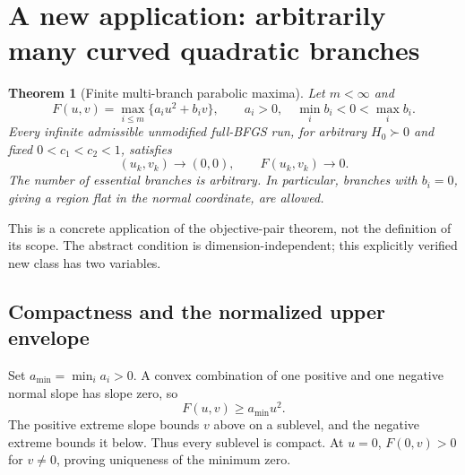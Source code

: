 \documentclass[10pt,oneside,openany]{book}
\newtheorem{theorem}{Theorem}[chapter]
\theoremstyle{remark}\newtheorem{remark}{Remark}[chapter]
\begin{document}
\begingroup
\providecommand{\R}{}
\renewcommand{\R}{\mathbb R}
\providecommand{\tr}{}
\renewcommand{\tr}{\operatorname{tr}}
\providecommand{\diag}{}
\renewcommand{\diag}{\operatorname{diag}}
\providecommand{\Span}{}
\renewcommand{\Span}{\operatorname{span}}
\providecommand{\ip}{}
\renewcommand{\ip}[2]{\langle #1,#2\rangle}
\providecommand{\norm}{}
\renewcommand{\norm}[1]{\lVert #1\rVert}
\providecommand{\T}{}
\renewcommand{\T}{^{\mathsf T}}
\providecommand{\D}{}
\renewcommand{\D}{\mathcal D}
\setcounter{section}{4}
\setcounter{theorem}{1}
\setcounter{lemma}{0}
\setcounter{corollary}{0}
\setcounter{proposition}{0}
\setcounter{remark}{0}
\setcounter{equation}{6}
\section{A new application: arbitrarily many curved quadratic branches}
\begin{theorem}[Finite multi-branch parabolic maxima]
Let $m<\infty$ and
\[
 F(u,v)=\max_{i\le m}\{a_i u^2+b_i v\},\qquad
 a_i>0,\quad\min_i b_i<0<\max_i b_i.
\]
Every infinite admissible unmodified full-BFGS run, for arbitrary $H_0\succ0$ and fixed $0<c_1<c_2<1$, satisfies
\[
 (u_k,v_k)\to(0,0),\qquad F(u_k,v_k)\to0.
\]
The number of essential branches is arbitrary. In particular, branches with $b_i=0$, giving a region flat in the normal coordinate, are allowed.
\end{theorem}
This is a concrete application of the objective-pair theorem, not the definition of its scope. The abstract condition is dimension-independent; this explicitly verified new class has two variables.

\subsection{Compactness and the normalized upper envelope}
Set $a_{\min}=\min_i a_i>0$. A convex combination of one positive and one negative normal slope has slope zero, so
\[
 F(u,v)\ge a_{\min}u^2.
\]
The positive extreme slope bounds $v$ above on a sublevel, and the negative extreme bounds it below. Thus every sublevel is compact. At $u=0$, $F(0,v)>0$ for $v\ne0$, proving uniqueness of the minimum zero.
\end{document}
